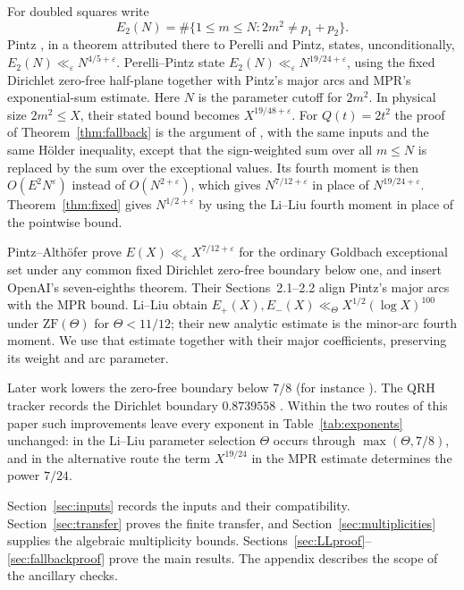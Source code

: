 \documentclass[11pt]{article}
\theoremstyle{definition}
\theoremstyle{remark}
\numberwithin{equation}{section}
\newcommand{\eps}{\varepsilon}
\begin{document}
For doubled squares write
\[
 E_2(N)=\#\{1\le m\le N:2m^2\ne p_1+p_2\}.
\]
Pintz \cite[Theorem~5]{Pintz2021}, in a theorem attributed there to
Perelli and Pintz, states, unconditionally, $E_2(N)\ll_\eps N^{4/5+\eps}$.
Perelli--Pintz \cite[Theorem~1 and (1.4)]{PP} state
$E_2(N)\ll_\eps N^{19/24+\eps}$, using the fixed Dirichlet zero-free
half-plane together with Pintz's major arcs and MPR's exponential-sum
estimate. Here $N$ is the parameter cutoff for $2m^2$. In physical
size $2m^2\le X$, their stated bound becomes $X^{19/48+\eps}$.
For $Q(t)=2t^2$ the proof of Theorem~\ref{thm:fallback} is the argument
of \cite[(3.1)--(3.10)]{PP}, with the same inputs and the same H\"older
inequality, except that the sign-weighted sum over all $m\le N$ is
replaced by the sum over the exceptional values. Its fourth moment is
then $O(E^2N^{\eps})$ instead of $O(N^{2+\eps})$, which gives
$N^{7/12+\eps}$ in place of $N^{19/24+\eps}$.
Theorem~\ref{thm:fixed} gives $N^{1/2+\eps}$ by using the Li--Liu
fourth moment in place of the pointwise bound.

Pintz--Alth\"ofer \cite[Theorem~1 and Corollary~2]{PA} prove
$E(X)\ll_\eps X^{7/12+\eps}$ for the ordinary Goldbach exceptional
set under any common fixed Dirichlet zero-free boundary below one,
and insert OpenAI's seven-eighths theorem. Their Sections~2.1--2.2
align Pintz's major arcs with the MPR bound. Li--Liu
\cite[Theorems~1--2 and Proposition~4.1]{LL} obtain
$E_+(X),E_-(X)\ll_\Theta X^{1/2}(\log X)^{100}$ under
$\mathrm{ZF}(\Theta)$ for $\Theta<11/12$; their new analytic estimate
is the minor-arc fourth moment. We use that estimate together with
their major coefficients, preserving its weight and arc parameter.

Later work lowers the zero-free boundary below $7/8$ (for instance
\cite{Gao,Argonaut,LiuRefinement,XuSang,LiuHecke}). The QRH tracker
records the Dirichlet boundary $0.8739558$ \cite{Sussman}.
Within the two routes of this paper such improvements leave every
exponent in Table~\ref{tab:exponents} unchanged: in the Li--Liu parameter
selection $\Theta$ occurs through $\max(\Theta,7/8)$, and in the
alternative route the term $X^{19/24}$ in the MPR estimate determines
the power $7/24$.

Section~\ref{sec:inputs} records the inputs and their compatibility.
Section~\ref{sec:transfer} proves the finite transfer, and
Section~\ref{sec:multiplicities} supplies the algebraic multiplicity
bounds. Sections~\ref{sec:LLproof}--\ref{sec:fallbackproof} prove the
main results. The appendix describes the scope of the ancillary checks.
\end{document}
